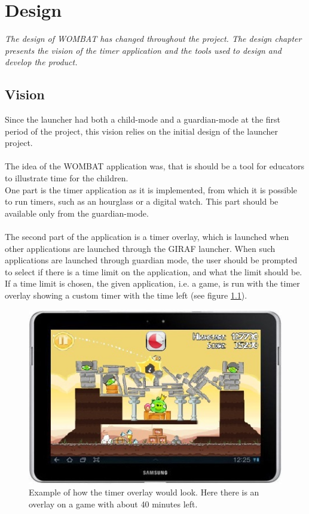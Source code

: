 \chapter{Design}
\textit{The design of WOMBAT has changed throughout the project. The design chapter presents the vision of the timer application and the tools used to design and develop the product.} %

\section{Vision}
\label{sec:vision}
Since the launcher had both a child-mode and a guardian-mode at the first period of the project, this vision relies on the initial design of the launcher project.\\ \\
	The idea of the WOMBAT application was, that is should be a tool for educators to illustrate time for the children.\\
	
One part is the timer application as it is implemented, from which it is possible to run timers, such as an hourglass or a digital watch. This part should be available only from the guardian-mode.\\ \\
  The second part of the application is a timer overlay, which is launched when other applications are launched through the GIRAF launcher. When such applications are launched through guardian mode, the user should be prompted to select if there is a time limit on the application, and what the limit should be. If a time limit is chosen, the given application, i.e. a game, is run with the timer overlay showing a custom timer with the time left (see figure \ref{fig:init_overlay_drawings}).
	
	\begin{figure}[H]
		\centering
			\includegraphics[width=\textwidth]{Images/paper_prototype/overlay.png}
				\caption{Example of how the timer overlay would look. Here there is an overlay on a game with about 40 minutes left.}
		\label{fig:init_overlay_drawings}
	\end{figure}
	
